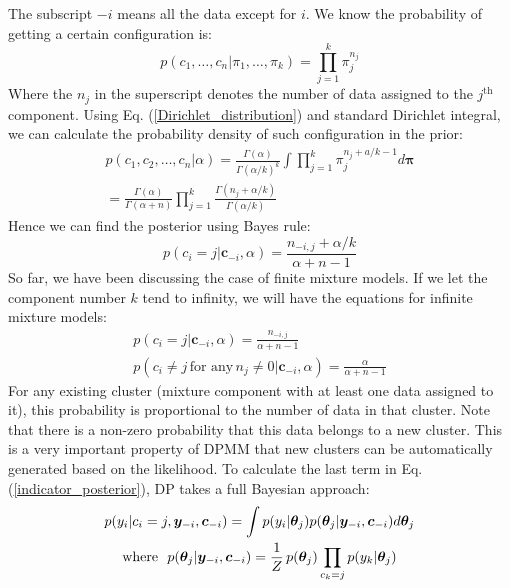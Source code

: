 \documentclass[journal]{IEEEtran}
\begin{document}
%
The subscript $-i$ means all the data except for $i$.
We know the probability of getting a certain configuration is:
\begin{equation}
p(c_1,\dots, c_n|\pi_1, \dots, \pi_k) = \prod_{j=1}^k \pi_j^{n_j}
\label{configuration_probability}
\end{equation}
Where the $n_j$ in the superscript denotes the number of data assigned to the $j^\text{th}$ component.
Using Eq. (\ref{Dirichlet_distribution}) and standard Dirichlet integral, we can calculate the probability density of such configuration in the prior:
\begin{equation}
\begin{gathered}
p(c_1, c_2, \dots, c_n | \alpha) =  \frac{\Gamma(\alpha)}
{\Gamma(\alpha / k)^k} \int \prod_{j=1}^k \pi_j^{n_j + a/k - 1} d\bm{\pi}
\\
= \frac{\Gamma(\alpha)}{\Gamma(\alpha + n)} 
\prod_{j=1}^k \frac{\Gamma(n_j + \alpha/k)}{\Gamma(\alpha/k)}
\end{gathered}
\label{indicator_prior}
\end{equation}
Hence we can find the posterior using Bayes rule:
\begin{equation}
p(c_i =j | \bm{c}_{-i} , \alpha) = 
\frac{n_{-i, j} + \alpha /k}{\alpha + n - 1}
\label{indicator_posterior_2}
\end{equation}
%
So far, we have been discussing the case of finite mixture models. If we let the component number $k$ tend to infinity, we will have the equations for infinite mixture models:
\begin{equation}
\begin{gathered}
p(c_i =j | \bm{c}_{-i} , \alpha) = 
\frac{n_{-i, j}}{\alpha + n - 1}
\\
p(c_i \neq j \, \text{for any} \, n_j \neq 0 | \bm{c}_{-i} , \alpha) = 
\frac{\alpha}{\alpha + n - 1}
\end{gathered}
\label{indicator_posterior_3}
\end{equation}
For any existing cluster (mixture component with at least one data assigned to it), this probability is proportional to the number of data in that cluster. 
Note that there is a non-zero probability that this data belongs to a new cluster. 
This is a very important property of DPMM that new clusters can be automatically generated based on the likelihood. 
To calculate the last term in Eq. (\ref{indicator_posterior}), DP takes a full Bayesian approach:
\begin{equation}
\begin{gathered}
p(y_i|c_i = j, \bm{y}_{-i}, \bm{c}_{-i}) = 
\int p(y_i|\bm{\theta}_j)
p(\bm{\theta}_j|\bm{y}_{-i}, \bm{c}_{-i})
d\bm{\theta}_j
%
\\
%
\text{where \,\,} 
p(\bm{\theta}_j|\bm{y}_{-i}, \bm{c}_{-i}) = \frac{1}{Z}
\,
p(\bm{\theta}_j)
\prod_{c_k=j} p(y_k|\bm{\theta}_j)
\end{gathered}
\label{integral_1}
\end{equation}
\end{document}
